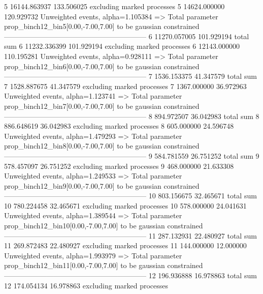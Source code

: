5          16144.863937    133.506025      excluding marked processes    
5          14624.000000    120.929732      Unweighted events, alpha=1.105384
  => Total parameter prop_binch12_bin5[0.00,-7.00,7.00] to be gaussian constrained
------------------------------------------------------------
6          11270.057005    101.929194      total sum                     
6          11232.336399    101.929194      excluding marked processes    
6          12143.000000    110.195281      Unweighted events, alpha=0.928111
  => Total parameter prop_binch12_bin6[0.00,-7.00,7.00] to be gaussian constrained
------------------------------------------------------------
7          1536.153375     41.347579       total sum                     
7          1528.887675     41.347579       excluding marked processes    
7          1367.000000     36.972963       Unweighted events, alpha=1.123741
  => Total parameter prop_binch12_bin7[0.00,-7.00,7.00] to be gaussian constrained
------------------------------------------------------------
8          894.972507      36.042983       total sum                     
8          886.648619      36.042983       excluding marked processes    
8          605.000000      24.596748       Unweighted events, alpha=1.479293
  => Total parameter prop_binch12_bin8[0.00,-7.00,7.00] to be gaussian constrained
------------------------------------------------------------
9          584.781559      26.751252       total sum                     
9          578.457097      26.751252       excluding marked processes    
9          468.000000      21.633308       Unweighted events, alpha=1.249533
  => Total parameter prop_binch12_bin9[0.00,-7.00,7.00] to be gaussian constrained
------------------------------------------------------------
10         803.156675      32.465671       total sum                     
10         780.224458      32.465671       excluding marked processes    
10         578.000000      24.041631       Unweighted events, alpha=1.389544
  => Total parameter prop_binch12_bin10[0.00,-7.00,7.00] to be gaussian constrained
------------------------------------------------------------
11         287.132931      22.480927       total sum                     
11         269.872483      22.480927       excluding marked processes    
11         144.000000      12.000000       Unweighted events, alpha=1.993979
  => Total parameter prop_binch12_bin11[0.00,-7.00,7.00] to be gaussian constrained
------------------------------------------------------------
12         196.936888      16.978863       total sum                     
12         174.054134      16.978863       excluding marked processes    
